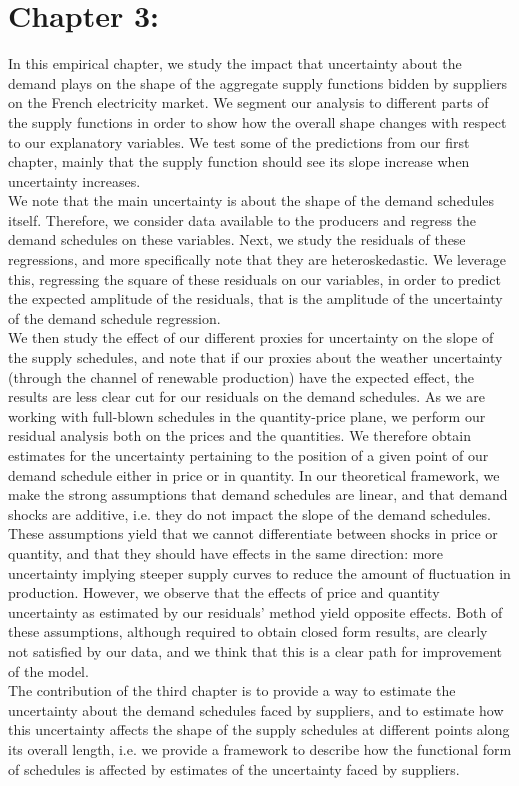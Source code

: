 \section*{Chapter 3: }

In this empirical chapter, we study the impact that uncertainty about the demand plays on the shape of the aggregate supply functions bidden by suppliers on the French electricity market. We segment our analysis to different parts of the supply functions in order to show how the overall shape changes with respect to our explanatory variables. We test some of the predictions from our first chapter, mainly that the supply function should see its slope increase when uncertainty increases. \\

We note that the main uncertainty is about the shape of the demand schedules itself. Therefore, we consider data available to the producers and regress the demand schedules on these variables. Next, we study the residuals of these regressions, and more specifically note that they are heteroskedastic. We leverage this, regressing the square of these residuals on our variables, in order to predict the expected amplitude of the residuals, that is the amplitude of the uncertainty of the demand schedule regression.\\

We then study the effect of our different proxies for uncertainty on the slope of the supply schedules, and note that if our proxies about the weather uncertainty (through the channel of renewable production) have the expected effect, the results are less clear cut for our residuals on the demand schedules. As we are working with full-blown schedules in the quantity-price plane, we perform our residual analysis both on the prices and the quantities. We therefore obtain estimates for the uncertainty pertaining to the position of a given point of our demand schedule either in price or in quantity. In our theoretical framework, we make the strong assumptions that demand schedules are linear, and that demand shocks are additive, i.e. they do not impact the slope of the demand schedules. These assumptions yield that we cannot differentiate between shocks in price or quantity, and that they should have effects in the same direction: more uncertainty implying steeper supply curves to reduce the amount of fluctuation in production. However, we observe that the effects of price and quantity uncertainty as estimated by our residuals' method yield opposite effects. Both of these assumptions, although required to obtain closed form results, are clearly not satisfied by our data, and we think that this is a clear path for improvement of the model.  \\

The contribution of the third chapter is to provide a way to estimate the uncertainty about the demand schedules faced by suppliers, and to estimate how this uncertainty affects the shape of the supply schedules at different points along its overall length, i.e. we provide a framework to describe how the functional form of schedules is affected by estimates of the uncertainty faced by suppliers.\\